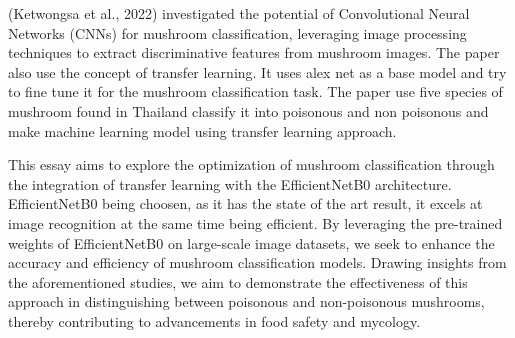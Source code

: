 (Ketwongsa et al., 2022) investigated the potential of Convolutional Neural Networks (CNNs) for mushroom classification, leveraging image processing techniques to extract discriminative features from mushroom images. The paper also use the concept of transfer learning. It uses alex net as a base model and try to fine tune it for the mushroom classification task\cite{ketwongsa2022new}. The paper use five species of mushroom found in Thailand classify it into poisonous and non poisonous and make machine learning model using transfer learning approach. 

This essay aims to explore the optimization of mushroom classification through the integration of transfer learning with the EfficientNetB0 architecture. EfficientNetB0 being choosen, as it has the state of the art result, it excels at image recognition at the same time being efficient. By leveraging the pre-trained weights of EfficientNetB0 on large-scale image datasets, we seek to enhance the accuracy and efficiency of mushroom classification models. Drawing insights from the aforementioned studies, we aim to demonstrate the effectiveness of this approach in distinguishing between poisonous and non-poisonous mushrooms, thereby contributing to advancements in food safety and mycology.